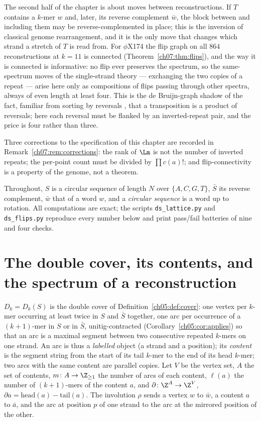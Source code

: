 The second half of the chapter is about moves between reconstructions. If $T$ contains a $k$-mer
$w$ and, later, its reverse complement $\bar w$, the block between and including them may be
reverse-complemented in place; this is the inversion of classical genome rearrangement, and it
is the only move that changes which strand a stretch of $T$ is read from. For $\phi$X174 the
flip graph on all $864$ reconstructions at $k=11$ is connected (Theorem~\ref{ch07:thm:flips}),
and the way it is connected is informative: no flip ever preserves the spectrum, so the
same-spectrum moves of the single-strand theory --- exchanging the two copies of a repeat ---
arise here only as compositions of flips passing through other spectra, always of even length
at least four. This is the de Bruijn-graph shadow of the fact, familiar from sorting by
reversals \cite{HP99,BP96}, that a transposition is a product of reversals; here each reversal
must be flanked by an inverted-repeat pair, and the price is four rather than three.

Three corrections to the specification of this chapter are recorded in
Remark~\ref{ch07:rem:corrections}: the rank of $\Lm$ is not the number of inverted repeats; the
per-point count must be divided by $\prod c(a)!$; and flip-connectivity is a property of the
genome, not a theorem.

Throughout, $S$ is a circular sequence of length $N$ over $\{A,C,G,T\}$, $\bar S$ its reverse
complement, $\bar w$ that of a word $w$, and a \emph{circular sequence} is a word up to
rotation. All computations are exact; the scripts \texttt{ds\_lattice.py} and
\texttt{ds\_flips.py} reproduce every number below and print pass/fail batteries of nine and
four checks.

\section{The double cover, its contents, and the spectrum of a reconstruction}\label{ch07:sec:cover}

\begin{definition}\label{ch07:def:cover}
$D_k=D_k(S)$ is the double cover of Definition~\ref{ch05:def:cover}: one vertex per $k$-mer
occurring at least twice in $S$ and $\bar S$ together, one arc per occurrence of a
$(k{+}1)$-mer in $S$ or in $\bar S$, unitig-contracted (Corollary~\ref{ch05:cor:applies}) so that an arc is a maximal segment between two consecutive
repeated $k$-mers on one strand. An arc is thus a \emph{labelled} object (a strand and a
position); its \emph{content} is the segment string from the start of its tail $k$-mer to the
end of its head $k$-mer; two arcs with the same content are parallel copies. Let $V$ be the
vertex set, $A$ the set of contents, $m\colon A\to\Z_{\ge1}$ the number of arcs of each
content, $\ell(a)$ the number of $(k{+}1)$-mers of the content $a$, and $\partial\colon
\Z^A\to\Z^V$, $\partial a=\mathrm{head}(a)-\mathrm{tail}(a)$. The involution $\rho$ sends a
vertex $w$ to $\bar w$, a content $a$ to $\bar a$, and the arc at position $p$ of one strand to
the arc at the mirrored position of the other.
\end{definition}

